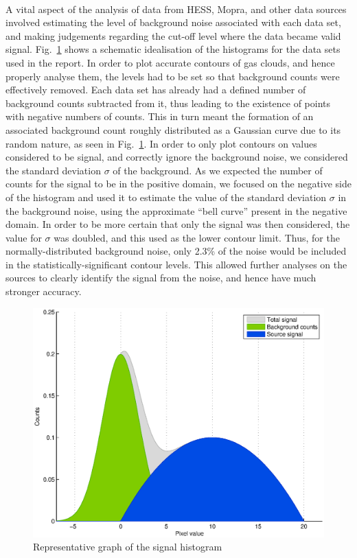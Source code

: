 \documentclass[a4paper, titlepage, oneside]{article}
\begin{document}
\begin{multicols}{2}
\paragraph{}
A vital aspect of the analysis of data from HESS, Mopra, and other data sources involved estimating the level of background noise associated with each data set, and making judgements regarding the cut-off level where the data became valid signal. Fig.~\ref{fig:noise} shows a schematic idealisation of the histograms for the data sets used in the report. In order to plot accurate contours of gas clouds, and hence properly analyse them, the levels had to be set so that background counts were effectively removed. Each data set has already had a defined number of background counts subtracted from it, thus leading to the existence of points with negative numbers of counts. This in turn meant the formation of an associated background count roughly distributed as a Gaussian curve due to its random nature, as seen in Fig.~\ref{fig:noise}. In order to only plot contours on values considered to be signal, and correctly ignore the background noise, we considered the standard deviation \(\sigma\) of the background. As we expected the number of counts for the signal to be in the positive domain, we focused on the negative side of the histogram and used it to estimate the value of the standard deviation \(\sigma\) in the background noise, using the approximate ``bell curve'' present in the negative domain. In order to be more certain that only the signal was then considered, the value for \(\sigma\) was doubled, and this used as the lower contour limit. Thus, for the normally-distributed background noise, only 2.3\% of the noise would be included in the statistically-significant contour levels. This allowed further analyses on the sources to clearly identify the signal from the noise, and hence have much stronger accuracy.

\begin{figure}[H]
  \centering
  \includegraphics[width = \columnwidth]{figures/noise-analysis}
  \caption{Representative graph of the signal histogram}
  \label{fig:noise}
\end{figure}


\end{multicols}
\end{document}
